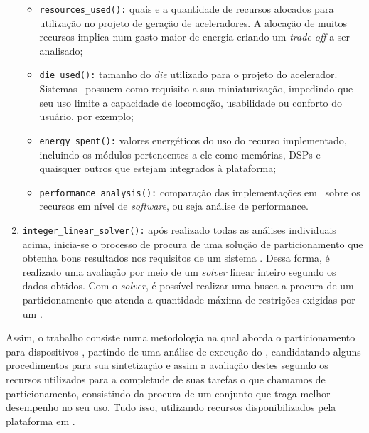 \begin{enumerate}
\begin{itemize}
            \item \texttt{resources\_used():}
               quais e a quantidade de recursos alocados para utilização no projeto de geração de aceleradores.
               A alocação de muitos recursos implica num gasto maior de energia criando um \textit{trade-off} a ser analisado;

            \item \texttt{die\_used():}
               tamanho do \textit{die} utilizado para o projeto do acelerador.
               Sistemas \wearable\ possuem como requisito a sua miniaturização, impedindo que seu uso limite a capacidade de locomoção, usabilidade ou conforto do usuário, por exemplo;

            \item \texttt{energy\_spent():}
               valores energéticos do uso do recurso implementado, incluindo os módulos pertencentes a ele como memórias, DSPs e quaisquer outros que estejam integrados à plataforma;

            \item \texttt{performance\_analysis():}
               comparação das implementações em \hardware\ sobre os recursos em nível de \textit{software}, ou seja análise de performance.
         \end{itemize}

         \item \texttt{integer\_linear\_solver():}
            após realizado todas as análises individuais acima, inicia-se o processo de procura de uma solução de particionamento que obtenha bons resultados nos requisitos de um sistema \wearable.
            Dessa forma, é realizado uma avaliação por meio de um \textit{solver} linear inteiro segundo os dados obtidos.
            Com o \textit{solver}, é possível realizar uma busca a procura de um particionamento que atenda a quantidade máxima de restrições exigidas por um \wearable.
      \end{enumerate}


      Assim, o trabalho consiste numa metodologia na qual aborda o particionamento para dispositivos \wearables, partindo de uma análise de execução do \software, candidatando alguns procedimentos para sua sintetização e assim a avaliação destes segundo os recursos utilizados para a completude de suas tarefas o que chamamos de particionamento, consistindo da procura de um conjunto que traga melhor desempenho no seu uso. Tudo isso, utilizando recursos disponibilizados pela plataforma em \hardware.
